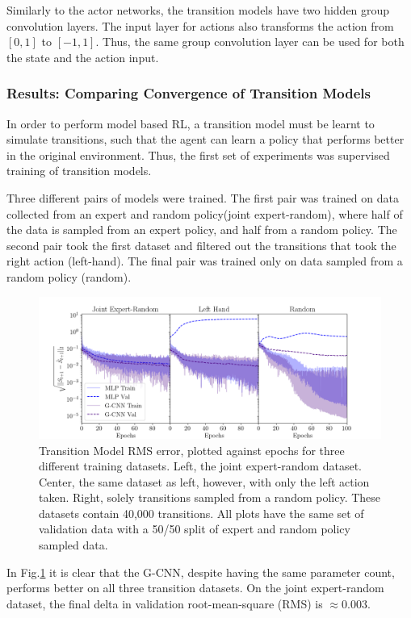 Similarly to the actor networks, the transition models have two hidden group convolution layers. The input layer for actions also transforms the action from $[0, 1]$ to $[-1, 1]$. Thus, the same group convolution layer can be used for both the state and the action input.


\subsubsection{Results: Comparing Convergence of Transition Models}
In order to perform model based RL, a transition model must be learnt to simulate transitions, such that the agent can learn a policy that performs better in the original environment. Thus, the first set of experiments was supervised training of transition models.

Three different pairs of models were trained. The first pair was trained on data collected from an expert and random policy(joint expert-random), where half of the data is sampled from an expert policy, and half from a random policy. The second pair took the first dataset and filtered out the transitions that took the right action (left-hand). The final pair was trained only on data sampled from a random policy (random).
\begin{figure}
	\centering
	\includegraphics[width=\linewidth]{Figures/transition_model_loss.png}
	\caption{Transition Model RMS error, plotted against epochs for three different training datasets. Left, the joint expert-random dataset. Center, the same dataset as left, however, with only the left action taken. Right, solely transitions sampled from a random policy. These datasets contain 40,000 transitions. All plots have the same set of validation data with a 50/50 split of expert and random policy sampled data.}
	\label{fig:cp_tm}
\end{figure}

In Fig.\ref{fig:cp_tm} it is clear that the G-CNN, despite having the same parameter count, performs better on all three transition datasets. On the joint expert-random dataset, the final delta in validation root-mean-square (RMS) is $\approx 0.003$.

